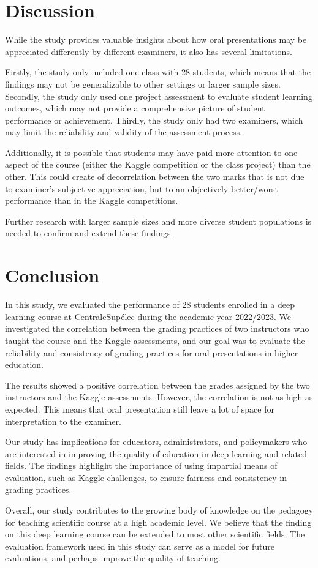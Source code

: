 \documentclass[a4paper]{article}
\begin{document}
	\section{Discussion}
	While the study provides valuable insights about how oral presentations may be appreciated differently by different examiners, it also has several limitations.
	
	Firstly, the study only included one class with 28 students, which means that the findings may not be generalizable to other settings or larger sample sizes.
	Secondly, the study only used one project assessment to evaluate student learning outcomes, which may not provide a comprehensive picture of student performance or achievement.
	Thirdly, the study only had two examiners, which may limit the reliability and validity of the assessment process.
	
	Additionally, it is possible that students may have paid more attention to one aspect of the course (either the Kaggle competition or the class project) than the other.
	This could create of decorrelation between the two marks that is not due to examiner's subjective appreciation, but to an objectively better/worst performance than in the Kaggle competitions.
	
	Further research with larger sample sizes and more diverse student populations is needed to confirm and extend these findings.
	
	\section{Conclusion}
	In this study, we evaluated the performance of 28 students enrolled in a deep learning course at CentraleSupélec during the academic year 2022/2023.
	We investigated the correlation between the grading practices of two instructors who taught the course and the Kaggle assessments, and our goal was to evaluate the reliability and consistency of grading practices for oral presentations in higher education.
	
	The results showed a positive correlation between the grades assigned by the two instructors and the Kaggle assessments.
	However, the correlation is not as high as expected.
	This means that oral presentation still leave a lot of space for interpretation to the examiner.
	
	Our study has implications for educators, administrators, and policymakers who are interested in improving the quality of education in deep learning and related fields.
	The findings highlight the importance of using impartial means of evaluation, such as Kaggle challenges, to ensure fairness and consistency in grading practices.
	
	Overall, our study contributes to the growing body of knowledge on the pedagogy for teaching scientific course at a high academic level.
	We believe that the finding on this deep learning course can be extended to most other scientific fields.
	The evaluation framework used in this study can serve as a model for future evaluations, and perhaps improve the quality of teaching.

	
	
\end{document}

